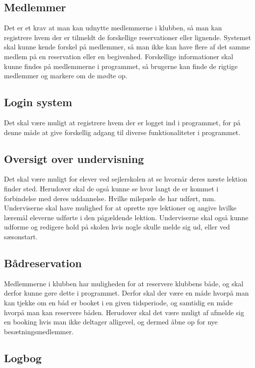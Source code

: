 \subsection{Medlemmer}

Det er et krav at man kan udnytte medlemmerne i klubben, så man kan registrere hvem der er tilmeldt de forskellige reservationer eller lignende. 
Systemet skal kunne kende forskel på medlemmer, så man ikke kan have flere af det samme medlem på en reservation eller en begivenhed.
Forskellige informationer skal kunne findes på medlemmerne i programmet, så brugerne kan finde de rigtige medlemmer og markere om de mødte op.

\subsection{Login system}
Det skal være muligt at registrere hvem der er logget ind i programmet, for på denne måde at give forskellig adgang til diverse funktionaliteter i programmet.

\subsection{Oversigt over undervisning}

Det skal være muligt for elever ved sejlerskolen at se hvornår deres næste lektion finder sted.
Herudover skal de også kunne se hvor langt de er kommet i forbindelse med deres uddannelse. Hvilke milepæle de har udført, mm.
Underviserne skal have mulighed for at oprette nye lektioner og angive hvilke læremål eleverne udførte i den pågældende lektion. 
Underviserne skal også kunne udforme og redigere hold på skolen hvis nogle skulle melde sig ud, eller ved sæsonstart.

\subsection{Bådreservation}

Medlemmerne i klubben har muligheden for at reservere klubbens både, og skal derfor kunne gøre dette i programmet.
Derfor skal der være en måde hvorpå man kan tjekke om en båd er booket i en given tidsperiode, og samtidig en måde hvorpå man kan reservere båden.
Herudover skal det være muligt af afmelde sig en booking hvis man ikke deltager alligevel, og dermed åbne op for nye besætningsmedlemmer.


\subsection{Logbog}

